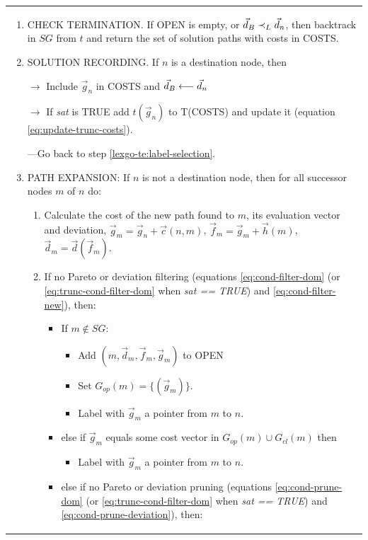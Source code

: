 \begin{table}
{\begin{tabular}{p{\columnwidth}}
\begin{enumerate}
\item CHECK TERMINATION. If OPEN is empty, or
  $\vec{d}_B \prec_{L} \vec{d}_n$, then backtrack in $SG$ from $t$
  and return the set of solution paths with costs in COSTS.

\item SOLUTION RECORDING. If $n$ is a destination node, then
    \par $\rightarrow$  Include $\vec g_n$ in COSTS and $\vec{d}_B \longleftarrow \vec{d}_n$
    \par $\rightarrow$ If \textit{sat} is TRUE add $t(\vec g_n)$ to T(COSTS) and update it (equation \ref{eq:update-trunc-costs}). 
    \par ---Go back to step \ref{lexgo-te:label-selection}.

\item PATH EXPANSION: If $n$ is not a destination node, then for all successor nodes $m$ of $n$ do:
    \begin{enumerate}
    \item Calculate the cost of the new path found to $m$, its evaluation vector and deviation, $\vec{g}_m = \vec{g}_n + \vec{c}(n,m)$,  $\vec{f}_m = \vec{g}_m + \vec{h}(m)$, $\vec{d}_m = \vec{d}(\vec{f}_m)$.
    \item If no Pareto or deviation filtering (equations \ref{eq:cond-filter-dom} (or \ref{eq:trunc-cond-filter-dom} when \textit{sat == TRUE}) and \ref{eq:cond-filter-new}), then:
      \begin{itemize}
      \item If $m \notin SG$: 
	\begin{itemize}
	\item Add $(m, \vec{d}_m, \vec{f}_m, \vec{g}_m)$ to OPEN
	\item Set $G_{op}(m)= \{(\vec{g}_m)\}$.
	\item Label with $\vec{g}_m$ a pointer from $m$ to $n$.
	\end{itemize}
      \item else if $\vec{g}_m$ equals some cost vector in  $G_{op}(m) \cup G_{cl}(m)$ then
	\begin{itemize}
	\item Label with $\vec{g}_m$ a pointer from $m$ to $n$.
	\end{itemize}
      \item else if no Pareto or deviation pruning (equations \ref{eq:cond-prune-dom} (or \ref{eq:trunc-cond-filter-dom} when \textit{sat == TRUE}) and \ref{eq:cond-prune-deviation}), then:  
	\begin{enumerate}

\end{enumerate}
\end{itemize}
\end{enumerate}
\end{enumerate}
\end{tabular}}
\end{table}
